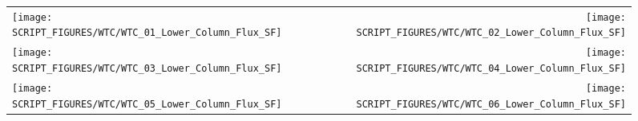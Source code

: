\begin{figure}[p]
\begin{tabular*}{\textwidth}{l@{\extracolsep{\fill}}r}
\texttt{[image: SCRIPT\_FIGURES/WTC/WTC\_01\_Lower\_Column\_Flux\_SF]} &
\texttt{[image: SCRIPT\_FIGURES/WTC/WTC\_02\_Lower\_Column\_Flux\_SF]} \\
\texttt{[image: SCRIPT\_FIGURES/WTC/WTC\_03\_Lower\_Column\_Flux\_SF]} &
\texttt{[image: SCRIPT\_FIGURES/WTC/WTC\_04\_Lower\_Column\_Flux\_SF]} \\
\texttt{[image: SCRIPT\_FIGURES/WTC/WTC\_05\_Lower\_Column\_Flux\_SF]} &
\texttt{[image: SCRIPT\_FIGURES/WTC/WTC\_06\_Lower\_Column\_Flux\_SF]}
\end{tabular*}
\end{figure}

